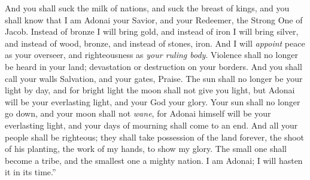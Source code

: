 \begin{biblechapter}
\verse And you shall suck the milk of nations, 
and suck the breast of kings, 
and you shall know that I am Adonai your Savior, 
and your Redeemer, the Strong One of Jacob.
\verse Instead of bronze I will bring gold, 
and instead of iron I will bring silver, 
and instead of wood, bronze, 
and instead of stones, iron. 
And I will \textit{appoint} peace as your overseer, 
and righteousness as \textit{your ruling body}.
\verse Violence shall no longer be heard in your land; 
devastation or destruction on your borders. 
And you shall call your walls Salvation, 
and your gates, Praise.
\verse The sun shall no longer be your light by day, 
and for bright light the moon shall not give you light, 
but Adonai will be your everlasting light, 
and your God your glory.
\verse Your sun shall no longer go down, 
and your moon shall not \textit{wane}, 
for Adonai himself will be your everlasting light, 
and your days of mourning shall come to an end.
\verse And all your people shall be righteous; 
they shall take possession of the land forever, 
the shoot of his planting, 
the work of my hands, to show my glory.
\verse The small one shall become a tribe, 
and the smallest one a mighty nation. I am Adonai; I will hasten it in its time.”
\end{biblechapter}

